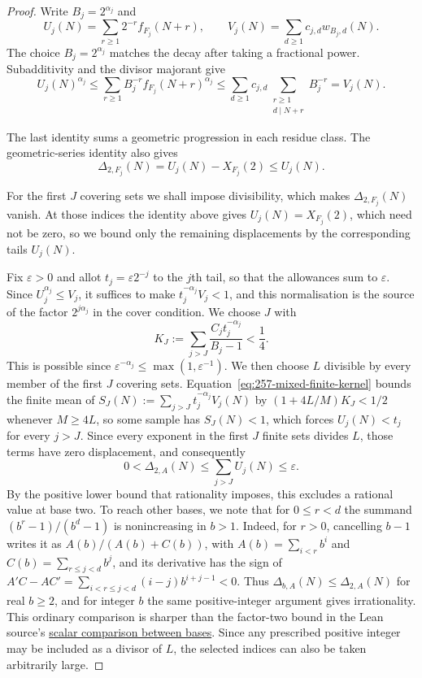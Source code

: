 \documentclass[11pt]{article}
\theoremstyle{plain}
\theoremstyle{definition}
\theoremstyle{remark}
\begin{document}
\begin{proof}
Write $B_j=2^{\alpha_j}$ and
\[
 U_j(N)=\sum_{r\ge1}2^{-r}f_{F_j}(N+r),\qquad
 V_j(N)=\sum_{d\ge1}c_{j,d}w_{B_j,d}(N).
\]
The choice $B_j=2^{\alpha_j}$ matches the decay after taking a
fractional power.  Subadditivity and the divisor majorant give
\[
 U_j(N)^{\alpha_j}
 \le\sum_{r\ge1}B_j^{-r}f_{F_j}(N+r)^{\alpha_j}
 \le\sum_{d\ge1}c_{j,d}
       \sum_{\substack{r\ge1\\d\mid N+r}}B_j^{-r}
 =V_j(N).
\]
\par\noindent
\begin{minipage}{\linewidth}
The last identity sums a geometric progression in each residue class.
The geometric-series identity also gives
\[
 \Delta_{2,F_j}(N)=U_j(N)-X_{F_j}(2)\le U_j(N).
\]
\end{minipage}
\par
For the first $J$ covering sets we shall impose divisibility, which makes
$\Delta_{2,F_j}(N)$ vanish. At those indices the identity above gives
$U_j(N)=X_{F_j}(2)$, which need not be zero, so we bound only the
remaining displacements by the corresponding tails $U_j(N)$.

Fix $\varepsilon>0$ and allot $t_j=\varepsilon2^{-j}$ to the $j$th tail,
so that the allowances sum to $\varepsilon$. Since
$U_j^{\alpha_j}\le V_j$, it suffices to make $t_j^{-\alpha_j}V_j<1$, and
this normalisation is the source of the factor $2^{j\alpha_j}$ in the
cover condition. We choose $J$ with
\[
 K_J:=\sum_{j>J}\frac{C_jt_j^{-\alpha_j}}{B_j-1}<\frac14.
\]
This is possible since $\varepsilon^{-\alpha_j}\le\max(1,\varepsilon^{-1})$.
We then choose $L$ divisible by every member of the first $J$ covering
sets. Equation~\eqref{eq:257-mixed-finite-kernel} bounds the finite mean
of $S_J(N):=\sum_{j>J}t_j^{-\alpha_j}V_j(N)$ by $(1+4L/M)K_J<1/2$
whenever $M\ge4L$, so some sample has $S_J(N)<1$, which forces
$U_j(N)<t_j$ for every $j>J$. Since every exponent in the first $J$
finite sets divides $L$, those terms have zero displacement, and
consequently
\[
 0<\Delta_{2,A}(N)\le\sum_{j>J}U_j(N)\le\varepsilon.
\]
By the positive lower bound that rationality imposes, this excludes a
rational value at base two. To reach other bases, we note that for
$0\le r<d$ the summand $(b^r-1)/(b^d-1)$ is nonincreasing in $b>1$.
Indeed, for $r>0$, cancelling $b-1$ writes it as $A(b)/(A(b)+C(b))$,
with $A(b)=\sum_{i<r}b^i$ and $C(b)=\sum_{r\le j<d}b^j$, and its
derivative has the sign of $A'C-AC'=\sum_{i<r\le j<d}(i-j)b^{i+j-1}<0$.
Thus $\Delta_{b,A}(N)\le\Delta_{2,A}(N)$ for real $b\ge2$, and for
integer $b$ the same positive-integer argument gives irrationality.
This ordinary comparison is sharper than the factor-two bound in the
Lean source's
\href{https://github.com/wcook04/plectis-erdos-lean/blob/52f29ad173b04e3bac941b3663f2b9aebe5de0bb/ErdosProblems/Erdos257/PaperCompleteR7/CoverKernel.lean#L232}{scalar comparison between bases}.
Since any prescribed positive integer may be included as a divisor of
$L$, the selected indices can also be taken arbitrarily large.
\end{proof}
\end{document}
